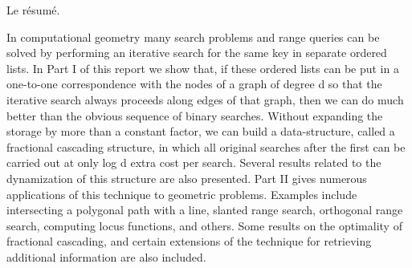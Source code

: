 \documentclass[11pt]{thesul}
\begin{document}
    \NumberAbstractPages
    \begin{ThesisAbstract}

        \begin{FrenchAbstract}
            Le résumé.
        \end{FrenchAbstract}

        \begin{EnglishAbstract}
            In computational geometry many search problems and range queries can be solved by performing an iterative search for the same key in separate ordered lists.  In Part I of this report we show that, if these ordered lists can be put in a one-to-one correspondence with the nodes of a graph of degree  d  so that the iterative search always proceeds along edges of that graph, then we can do much better than the obvious sequence of binary searches. Without expanding the storage by more than a constant factor, we can build a data-structure, called a fractional cascading structure, in which all original searches after the first can be carried out at only  log d  extra cost per search.  Several results related to the dynamization of this structure are also presented. Part II gives  numerous applications of this technique to geometric problems.
            Examples include intersecting a polygonal path with a line, slanted range search, orthogonal range search, computing locus functions, and others. Some results on the optimality of fractional cascading, and certain extensions of the technique for retrieving additional information are also included.
        \end{EnglishAbstract}
    \end{ThesisAbstract}
\end{document}
